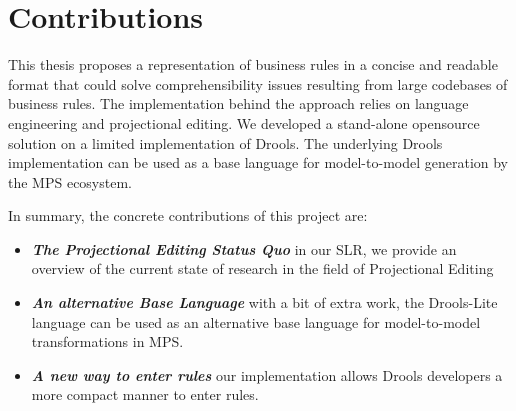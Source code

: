 \section{Contributions}

This thesis proposes a representation of business rules in a concise and readable format that could solve comprehensibility issues resulting from large codebases of business rules.
The implementation behind the approach relies on language engineering and projectional editing.
We developed a stand-alone opensource solution on a limited implementation of Drools.
The underlying Drools implementation can be used as a base language for model-to-model generation by the MPS ecosystem.

In summary, the concrete contributions of this project are:
\begin{itemize}
    \item \emph{\textbf{The Projectional Editing Status Quo}} in our SLR, we provide an overview of the current state of research in the field of Projectional Editing
    \item \emph{\textbf{An alternative Base Language}} with a bit of extra work, the Drools-Lite language can be used as an alternative base language for model-to-model transformations in MPS.
    \item \emph{\textbf{A new way to enter rules}} our implementation allows Drools developers a more compact manner to enter rules.
\end{itemize}